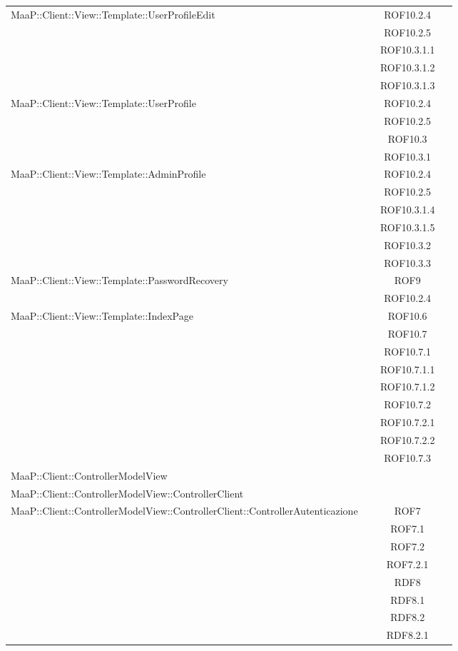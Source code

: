 \begin{center}
\begin{longtable}{|p{0.8\linewidth}|c|}
\midrule 
MaaP::Client::View::Template::UserProfileEdit
& ROF10.2.4\\
& ROF10.2.5\\
& ROF10.3.1.1\\
& ROF10.3.1.2\\
& ROF10.3.1.3\\

\midrule 
MaaP::Client::View::Template::UserProfile
& ROF10.2.4\\
& ROF10.2.5\\
& ROF10.3\\
& ROF10.3.1\\

\midrule 
MaaP::Client::View::Template::AdminProfile
& ROF10.2.4\\
& ROF10.2.5\\
& ROF10.3.1.4\\
& ROF10.3.1.5\\
& ROF10.3.2\\
& ROF10.3.3\\


\midrule 
MaaP::Client::View::Template::PasswordRecovery
& ROF9\\
& ROF10.2.4\\

\midrule 
MaaP::Client::View::Template::IndexPage
& ROF10.6\\
& ROF10.7\\
& ROF10.7.1\\
& ROF10.7.1.1\\
& ROF10.7.1.2\\
& ROF10.7.2\\
& ROF10.7.2.1\\
& ROF10.7.2.2\\
& ROF10.7.3\\

\midrule 
MaaP::Client::ControllerModelView
& \\

\midrule 
MaaP::Client::ControllerModelView::ControllerClient
& \\

\midrule 
MaaP::Client::ControllerModelView::ControllerClient::ControllerAutenticazione
& ROF7\\
& ROF7.1\\
& ROF7.2\\
& ROF7.2.1\\
& RDF8\\
& RDF8.1\\
& RDF8.2\\
& RDF8.2.1\\


\end{longtable}
\end{center}

